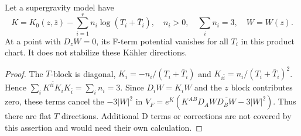 \begin{proposition}\label{prop:noscale}
Let a supergravity model have
\[
 K=K_0(z,\bar z)-\sum_{i=1}^r n_i\log(T_i+\bar T_i),
 \quad n_i>0,\quad\sum_i n_i=3,\quad W=W(z).
\]
At a point with $D_zW=0$, its F-term potential vanishes for all $T_i$
in this product chart. It does not stabilize these K\"ahler directions.
\end{proposition}
\begin{proof}
The $T$-block is diagonal,
$K_i=-n_i/(T_i+\bar T_i)$ and
$K_{i\bar i}=n_i/(T_i+\bar T_i)^2$. Hence
$\sum_iK^{i\bar i}K_iK_{\bar i}=\sum_i n_i=3$.
Since $D_iW=K_iW$ and the $z$ block contributes zero, these terms cancel
the $-3|W|^2$ in $V_F=e^K(K^{A\bar B}D_AW\overline{D_BW}-3|W|^2)$.
Thus there are flat $T$ directions. Additional D terms or corrections are
not covered by this assertion and would need their own calculation.
\end{proof}




